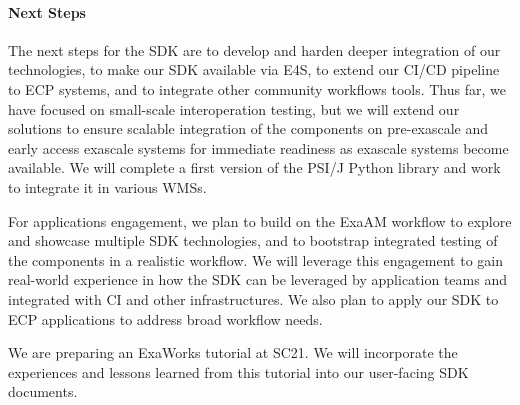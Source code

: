 \paragraph{Next Steps}


The next steps for the SDK are to develop and harden deeper integration of our
technologies, to make our SDK available via E4S,
 to extend our CI/CD pipeline to ECP systems, and to integrate
other community workflows tools. Thus far, we have focused on small-scale
interoperation testing, but we will extend our solutions to ensure scalable
integration of the components on pre-exascale and early access exascale
systems for immediate readiness as exascale systems become available. 
We will complete a first version of the PSI/J  Python library and work 
to integrate it in various WMSs. 

For applications engagement, we plan to build on the ExaAM workflow to explore
and showcase multiple SDK technologies, and to bootstrap integrated testing of
the components in a realistic workflow. We will leverage this engagement to
gain real-world experience in how the SDK can be leveraged by application teams
and integrated with CI and other infrastructures.  We also plan to apply our
SDK to ECP applications to address broad workflow needs.

We are preparing 
an ExaWorks tutorial at SC21. We will incorporate the
experiences and lessons learned from this tutorial into our
user-facing SDK documents.
